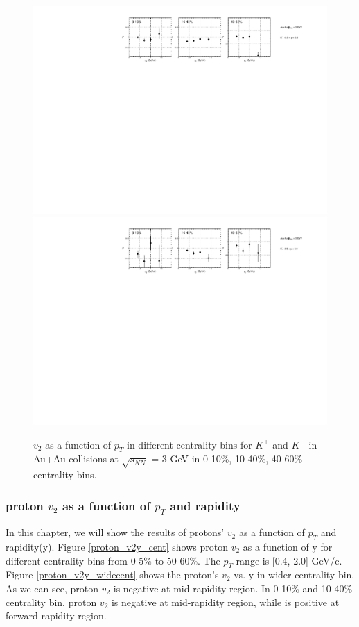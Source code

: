 \begin{figure}[h]
\includegraphics[scale=0.5]{chapter3/fig/v2ptpikp/kaonp_v2pt_wide_cent.pdf}
\includegraphics[scale=0.5]{chapter3/fig/v2ptpikp/kaonm_v2pt_wide_cent.pdf}
\caption{$v_{2}$ as a function of $p_{T}$ in different centrality bins for $K^{+}$ and $K^{-}$ in Au+Au collisions at $\sqrt{s_{NN}}$ = 3 GeV in 0-10\%, 10-40\%, 40-60\% centrality bins.}
\label{kaon_v2pt_widecent}
\end{figure}






\clearpage


\subsubsection{proton $v_{2}$ as a function of $p_{T}$ and rapidity}
In this chapter, we will show the results of protons' $v_{2}$ as a function of $p_{T}$ and rapidity(y).
Figure \ref{proton_v2y_cent} shows proton $v_{2}$ as a function of y for different centrality bins from 0-5\% to 50-60\%. The $p_{T}$ range is [0.4, 2.0] GeV/c. Figure \ref{proton_v2y_widecent} shows the proton’s $v_{2}$ vs. y in wider centrality bin. As we can see, proton $v_{2}$ is negative at mid-rapidity region. In 0-10\% and 10-40\% centrality bin, proton $v_{2}$ is negative at mid-rapidity region, while is positive at forward rapidity region.



